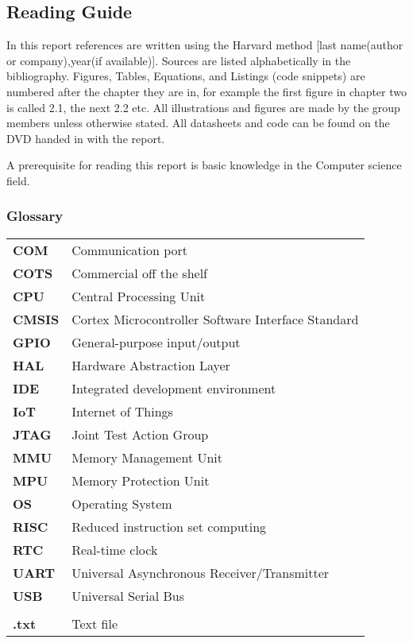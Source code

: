 \subsection*{Reading Guide}
\label{sub:reading_guide}

In this report references are written using the Harvard method [last name(author or company),year(if available)].
Sources are listed alphabetically in the bibliography.
Figures, Tables, Equations, and Listings (code snippets) are numbered after the chapter they are in,
for example the first figure in chapter two is called 2.1, the next 2.2 etc.
All illustrations and figures are made by the group members unless otherwise stated.
All datasheets and code can be found on the DVD handed in with the report.

A prerequisite for reading this report is basic knowledge in the 
Computer science field.

\subsubsection*{Glossary}
\begin{longtable}{l p{12cm}}
\textbf{COM}		& \qquad \qquad Communication port\\
\textbf{COTS}		& \qquad \qquad Commercial off the shelf\\
\textbf{CPU}		& \qquad \qquad Central Processing Unit\\
\textbf{CMSIS}		& \qquad \qquad Cortex Microcontroller Software Interface Standard\\
\textbf{GPIO}		& \qquad \qquad General-purpose input/output\\
\textbf{HAL}		& \qquad \qquad Hardware Abstraction Layer\\
\textbf{IDE}		& \qquad \qquad Integrated development environment\\
\textbf{IoT}		& \qquad \qquad Internet of Things\\
\textbf{JTAG}		& \qquad \qquad Joint Test Action Group\\
\textbf{MMU}		& \qquad \qquad Memory Management Unit\\
\textbf{MPU}		& \qquad \qquad Memory Protection Unit\\
\textbf{OS}			& \qquad \qquad Operating System\\
\textbf{RISC}		& \qquad \qquad Reduced instruction set computing\\
\textbf{RTC}		& \qquad \qquad Real-time clock\\
\textbf{UART}		& \qquad \qquad Universal Asynchronous Receiver/Transmitter\\
\textbf{USB}		& \qquad \qquad Universal Serial Bus\\
					& \\
\textbf{.txt}		& \qquad \qquad Text file\\

\end{longtable}
